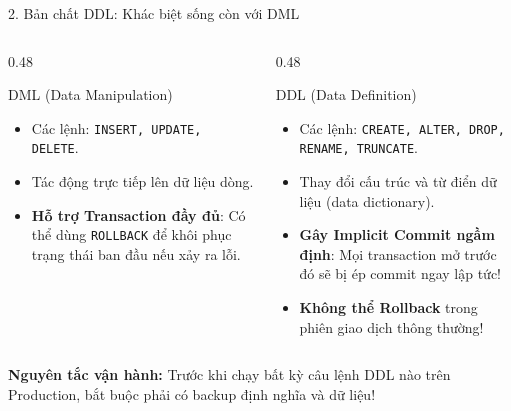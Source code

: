 \documentclass[aspectratio=169,11pt]{beamer}
\newcommand{\kw}[1]{\textcolor{dbblue}{\textbf{#1}}}
\newcommand{\smallgap}{\vspace{0.2em}}
\begin{document}
\begin{frame}{2. Bản chất DDL: Khác biệt sống còn với DML}
\begin{columns}[t]
  \begin{column}{0.48\textwidth}
    \begin{block}{DML (Data Manipulation)}
      \begin{itemize}\setlength{\itemsep}{1.5pt}
        \item Các lệnh: \texttt{INSERT, UPDATE, DELETE}.
        \item Tác động trực tiếp lên dữ liệu dòng.
        \item \kw{Hỗ trợ Transaction đầy đủ}: Có thể dùng \texttt{ROLLBACK} để khôi phục trạng thái ban đầu nếu xảy ra lỗi.
      \end{itemize}
    \end{block}
  \end{column}
  \begin{column}{0.48\textwidth}
    \begin{alertblock}{DDL (Data Definition)}
      \begin{itemize}\setlength{\itemsep}{1.5pt}
        \item Các lệnh: \texttt{CREATE, ALTER, DROP, RENAME, TRUNCATE}.
        \item Thay đổi cấu trúc và từ điển dữ liệu (data dictionary).
        \item \kw{Gây Implicit Commit ngầm định}: Mọi transaction mở trước đó sẽ bị ép commit ngay lập tức!
        \item \textbf{Không thể Rollback} trong phiên giao dịch thông thường!
      \end{itemize}
    \end{alertblock}
  \end{column}
\end{columns}

\smallgap
\begin{center}
  \footnotesize \textcolor{dborange}{\textbf{Nguyên tắc vận hành:}} Trước khi chạy bất kỳ câu lệnh DDL nào trên Production, bắt buộc phải có backup định nghĩa và dữ liệu!
\end{center}
\end{frame}

\end{document}
